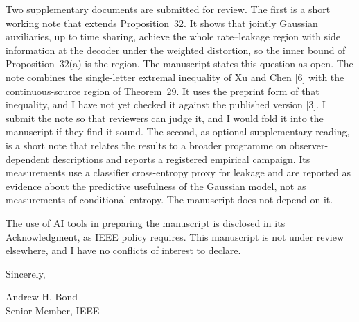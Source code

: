 \documentclass[11pt]{article}
\begin{document}
Two supplementary documents are submitted for review. The first is a
short working note that extends Proposition~32. It shows that jointly
Gaussian auxiliaries, up to time sharing, achieve the whole rate--leakage
region with side information at the decoder under the weighted
distortion, so the inner bound of Proposition~32(a) is the region. The
manuscript states this question as open. The note combines the
single-letter extremal inequality of Xu and Chen [6] with the
continuous-source region of Theorem~29. It uses the preprint form of
that inequality, and I have not yet checked it against the published
version [3]. I submit the note so that reviewers can judge it, and I would
fold it into the manuscript if they find it sound. The second, as
optional supplementary reading, is a short note that relates the results
to a broader programme on observer-dependent descriptions and reports a
registered empirical campaign. Its measurements use a classifier
cross-entropy proxy for leakage and are reported as evidence about the
predictive usefulness of the Gaussian model, not as measurements of
conditional entropy. The manuscript does not depend on it.

The use of AI tools in preparing the manuscript is disclosed in its
Acknowledgment, as IEEE policy requires. This manuscript is not under
review elsewhere, and I have no conflicts of interest to declare.

Sincerely,

Andrew H. Bond\\
Senior Member, IEEE
\end{document}
